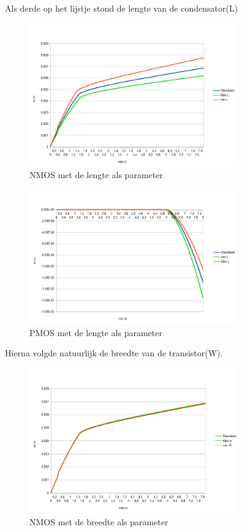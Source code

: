 \documentclass{article}
\begin{document}
\clearpage
Als derde op het lijstje stond de lengte van de condensator(L)

\begin{figure}[H]
	\centering
	\includegraphics[width=0.8\textwidth]{nmoslengte}
	\caption{NMOS met de lengte als parameter}
\end{figure}

\begin{figure}[H]
	\centering
	\includegraphics[width=0.8\textwidth]{pmoslengte}
	\caption{PMOS met de lengte als parameter}
\end{figure}

\clearpage
Hierna volgde natuurlijk de breedte van de transistor(W).

\begin{figure}[H]
	\centering
	\includegraphics[width=0.8\textwidth]{nmosbreedte}
	\caption{NMOS met de breedte als parameter}
\end{figure}
\end{document}
